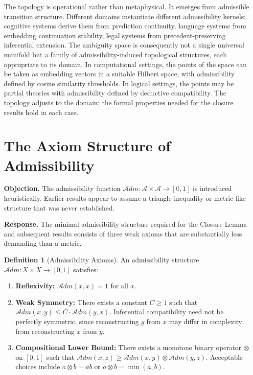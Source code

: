 \documentclass[12pt,oneside]{book}
\theoremstyle{plain}
\theoremstyle{definition}
\newtheorem{definition}[theorem]{Definition}
\theoremstyle{plain}
\newcommand{\cA}{\mathcal{A}}
\begin{document}
The topology is operational rather than metaphysical. It emerges from admissible transition structure. Different domains instantiate different admissibility kernels: cognitive systems derive them from prediction continuity, language systems from embedding continuation stability, legal systems from precedent-preserving inferential extension. The ambiguity space is consequently not a single universal manifold but a family of admissibility-induced topological structures, each appropriate to its domain. In computational settings, the points of the space can be taken as embedding vectors in a suitable Hilbert space, with admissibility defined by cosine similarity thresholds. In logical settings, the points may be partial theories with admissibility defined by deductive compatibility. The topology adjusts to the domain; the formal properties needed for the closure results hold in each case.

\section{The Axiom Structure of Admissibility}

\textbf{Objection.} The admissibility function $\mathcal{A}dm : \cA \times \cA \to [0,1]$ is introduced heuristically. Earlier results appear to assume a triangle inequality or metric-like structure that was never established.

\textbf{Response.} The minimal admissibility structure required for the Closure Lemma and subsequent results consists of three weak axioms that are substantially less demanding than a metric.

\begin{definition}[Admissibility Axioms]
An admissibility structure $\mathcal{A}dm : X \times X \to [0,1]$ satisfies:
\begin{enumerate}[noitemsep]
\item \textbf{Reflexivity:} $\mathcal{A}dm(x, x) = 1$ for all $x$.
\item \textbf{Weak Symmetry:} There exists a constant $C \geq 1$ such that $\mathcal{A}dm(x,y) \leq C \cdot \mathcal{A}dm(y,x)$. Inferential compatibility need not be perfectly symmetric, since reconstructing $y$ from $x$ may differ in complexity from reconstructing $x$ from $y$.
\item \textbf{Compositional Lower Bound:} There exists a monotone binary operator $\otimes$ on $[0,1]$ such that $\mathcal{A}dm(x,z) \geq \mathcal{A}dm(x,y) \otimes \mathcal{A}dm(y,z)$. Acceptable choices include $a \otimes b = ab$ or $a \otimes b = \min(a,b)$.
\end{enumerate}
\end{definition}
\end{document}
